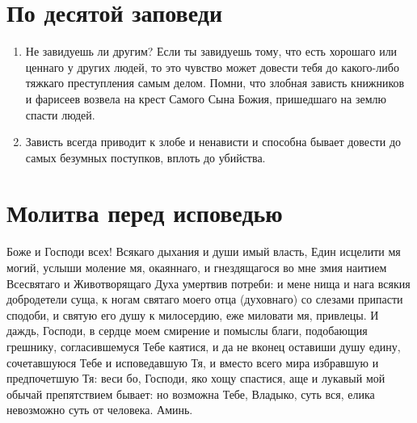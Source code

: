 \section{По десятой заповеди}\nopagebreak

\begin{mymulticols}

\begin{enumerate}

\item Не завидуешь ли другим? Если ты завидуешь тому, что есть хорошаго или ценнаго у других людей, то это чувство может довести тебя до какого-либо тяжкаго преступления самым делом. Помни, что злобная зависть книжников и фарисеев возвела на крест Самого Сына Божия, пришедшаго на землю спасти людей.

\item Зависть всегда приводит к злобе и ненависти и способна бывает довести до самых безумных поступков, вплоть до убийства.

\end{enumerate}

\end{mymulticols}

\mychapterending


\section{Молитва перед исповедью}
 

{\centering{}

} 

\begin{mymulticols}

Боже и Господи всех! Всякаго дыхания и души имый власть, Един исцелити мя могий, услыши моление мя, окаяннаго, и гнездящагося во мне змия наитием Всесвятаго и Животворящаго Духа умертвив потреби: и мене нища и нага всякия добродетели суща, к ногам святаго моего отца (духовнаго) со слезами припасти сподоби, и святую его душу к милосердию, еже миловати мя, привлецы. И даждь, Господи, в сердце моем смирение и помыслы благи, подобающия грешнику, согласившемуся Тебе каятися, и да не вконец оставиши душу едину, сочетавшуюся Тебе и исповедавшую Тя, и вместо всего мира избравшую и предпочетшую Тя: веси бо, Господи, яко хощу спастися, аще и лукавый мой обычай препятствием бывает: но возможна Тебе, Владыко, суть вся, елика невозможно суть от человека. Аминь. 

\end{mymulticols}

